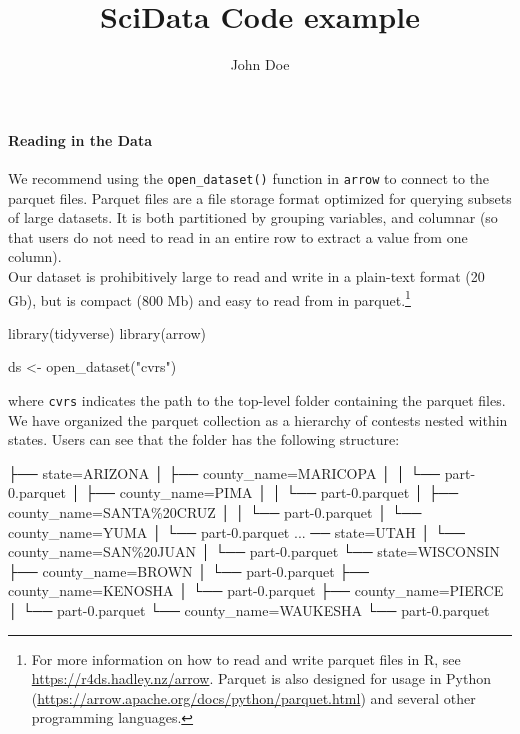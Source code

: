 \documentclass[fleqn,10pt]{wlscirep}
\title{SciData Code example}
\author[1,2,*]{John Doe}
\affil[1]{Department of Statistics}
\affil[2]{Department of Government}
\affil[*]{\texttt{correspondingauthor@email.com}}
\let\oldparagraph\paragraph
\renewcommand{\paragraph}[1]{\oldparagraph{#1}\mbox{}}
\newenvironment{Shaded}{\begin{snugshade}}{\end{snugshade}}
\newcommand{\FunctionTok}[1]{\textcolor[rgb]{0.28,0.35,0.67}{#1}}
\newcommand{\NormalTok}[1]{\textcolor[rgb]{0.00,0.23,0.31}{#1}}
\newcommand{\OtherTok}[1]{\textcolor[rgb]{0.00,0.23,0.31}{#1}}
\newcommand{\StringTok}[1]{\textcolor[rgb]{0.13,0.47,0.30}{#1}}
\begin{document}
\flushbottom


\maketitle

\thispagestyle{empty}
\paragraph{Reading in the Data}

We recommend using the \texttt{open\_dataset()} function in
\texttt{arrow} to connect to the parquet files. Parquet files are a file
storage format optimized for querying subsets of large datasets. It is
both partitioned by grouping variables, and columnar (so that users do
not need to read in an entire row to extract a value from one column).\\
Our dataset is prohibitively large to read and write in a plain-text
format (20 Gb), but is compact (800 Mb) and easy to read from in
parquet.\footnote{For more information on how to read and write parquet
  files in R, see \url{https://r4ds.hadley.nz/arrow}. Parquet is also
  designed for usage in Python
  (\url{https://arrow.apache.org/docs/python/parquet.html}) and several
  other programming languages.}

\begin{Shaded}
\begin{Highlighting}[]
\FunctionTok{library}\NormalTok{(tidyverse)}
\FunctionTok{library}\NormalTok{(arrow)}

\NormalTok{ds }\OtherTok{\textless{}{-}} \FunctionTok{open\_dataset}\NormalTok{(}\StringTok{"cvrs"}\NormalTok{)}
\end{Highlighting}
\end{Shaded}

where \texttt{cvrs} indicates the path to the top-level folder
containing the parquet files. We have organized the parquet collection
as a hierarchy of contests nested within states. Users can see that the
folder has the following structure:

\begin{Shaded}
\begin{Highlighting}[]
\NormalTok{├── state=ARIZONA}
\NormalTok{│   ├── county\_name=MARICOPA}
\NormalTok{│   │   └── part{-}0.parquet}
\NormalTok{│   ├── county\_name=PIMA}
\NormalTok{│   │   └── part{-}0.parquet}
\NormalTok{│   ├── county\_name=SANTA\%20CRUZ}
\NormalTok{│   │   └── part{-}0.parquet}
\NormalTok{│   └── county\_name=YUMA}
\NormalTok{│       └── part{-}0.parquet}
\NormalTok{...}
\NormalTok{── state=UTAH}
\NormalTok{│   └── county\_name=SAN\%20JUAN}
\NormalTok{│       └── part{-}0.parquet}
\NormalTok{└── state=WISCONSIN}
\NormalTok{    ├── county\_name=BROWN}
\NormalTok{    │   └── part{-}0.parquet}
\NormalTok{    ├── county\_name=KENOSHA}
\NormalTok{    │   └── part{-}0.parquet}
\NormalTok{    ├── county\_name=PIERCE}
\NormalTok{    │   └── part{-}0.parquet}
\NormalTok{    └── county\_name=WAUKESHA}
\NormalTok{        └── part{-}0.parquet}
\end{Highlighting}
\end{Shaded}
\end{document}
